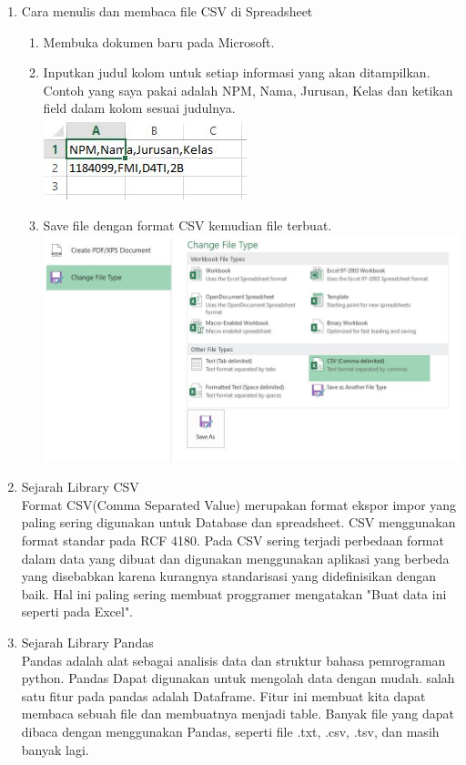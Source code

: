\begin{enumerate}
\item Cara menulis dan membaca file CSV di Spreadsheet\\
\begin{enumerate}
\item Membuka dokumen baru pada Microsoft.
\item Inputkan judul kolom untuk setiap informasi yang akan ditampilkan. Contoh yang saya pakai adalah NPM, Nama, Jurusan, Kelas dan ketikan field dalam kolom sesuai judulnya.\\
\includegraphics{gambar/csv1.jpg}
\item Save file dengan format CSV kemudian file terbuat.\\
\includegraphics[scale = 0.3]{gambar/csv2.jpg}
\end{enumerate}


\item Sejarah Library CSV\\
Format CSV(Comma Separated Value) merupakan format ekspor impor yang paling sering digunakan untuk Database dan spreadsheet. CSV menggunakan format standar pada RCF 4180. Pada CSV sering terjadi perbedaan format dalam data yang dibuat dan digunakan menggunakan aplikasi yang berbeda yang disebabkan karena kurangnya standarisasi yang didefinisikan dengan baik. Hal ini paling sering membuat proggramer mengatakan "Buat data ini seperti pada Excel".

\item Sejarah Library Pandas\\
Pandas adalah alat sebagai analisis data dan struktur bahasa pemrograman python. Pandas Dapat digunakan untuk mengolah data dengan mudah. salah satu fitur pada pandas adalah Dataframe. Fitur ini membuat kita dapat membaca sebuah file dan membuatnya menjadi table. Banyak file yang dapat dibaca dengan menggunakan Pandas, seperti file .txt, .csv, .tsv, dan masih banyak lagi.


\end{enumerate}
